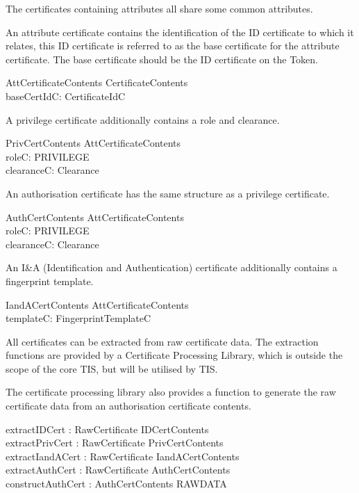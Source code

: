 The certificates containing attributes all share some common
attributes. 

An attribute certificate contains the identification of the ID
certificate to which it relates, this ID certificate is referred to as 
the base certificate for the attribute certificate. The base
certificate should be the ID certificate on the Token.  

\begin{schema}{AttCertificateContents}
        CertificateContents
\\      baseCertIdC: CertificateIdC      
\end{schema}


A privilege certificate additionally contains a role and clearance.
\begin{schema}{PrivCertContents}
	AttCertificateContents
\\	roleC: PRIVILEGE
\\	clearanceC: Clearance
\end{schema}


An authorisation certificate has the same structure as a privilege certificate.
\begin{schema}{AuthCertContents}
	AttCertificateContents
\\	roleC: PRIVILEGE
\\	clearanceC: Clearance
\end{schema}

An I\&A (Identification and Authentication) certificate additionally contains
a fingerprint template. 
\begin{schema}{IandACertContents}
	AttCertificateContents
\\	templateC: FingerprintTemplateC
\end{schema}

All certificates can be extracted from raw certificate data. The
extraction functions are provided by a Certificate Processing Library,
which is outside the scope of the core TIS, but will be utilised by TIS.

The certificate processing library also provides a function to
generate the raw certificate data from an authorisation certificate contents.

\begin{axdef}
        extractIDCert : RawCertificate \pfun IDCertContents
\\      extractPrivCert : RawCertificate \pfun PrivCertContents
\\      extractIandACert : RawCertificate \pfun IandACertContents
\\      extractAuthCert : RawCertificate \pfun AuthCertContents
\\      constructAuthCert : AuthCertContents \fun RAWDATA
\end{axdef}

